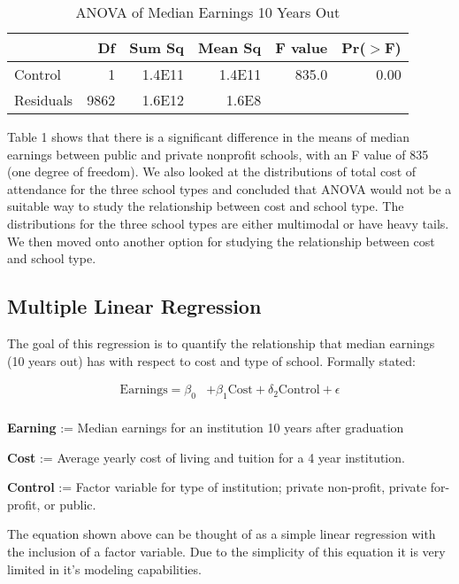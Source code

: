 \documentclass[%
 reprint,
 amsmath,amssymb,
 aps,
]{revtex4-1}
\begin{document}
\begin{table}[ht]
	\caption{ANOVA of Median Earnings 10 Years Out}
	\label{Table 1}
	\centering
	\begin{tabular}{lrrrrr}
		  \hline
		   & Df & Sum Sq & Mean Sq & F value & Pr($>$F) \\ 
		     \hline
		     Control & 1 & 1.4E11 & 1.4E11 & 835.0 & 0.00 \\ 
		       Residuals & 9862 & 1.6E12 & 1.6E8 &  &  \\ 
		          \hline
	\end{tabular}
\end{table}


Table 1 shows that there is a significant difference in the means of median earnings between public and private nonprofit schools, with an F value of 835 (one degree of freedom).  We also looked at the distributions of total cost of attendance for the three school types and concluded that ANOVA would not be a suitable way to study the relationship between cost and school type.  The distributions for the three school types are either multimodal or have heavy tails.  We then moved onto another option for studying the relationship between cost and school type.


\subsection{\label{sec:level2} Multiple Linear Regression}
The goal of this regression is to quantify the relationship that median earnings (10 years out) has with respect to cost and type of school. Formally stated: 

\begin{align*}
	\mathrm{Earnings} = \beta_{0} 
    &+ \beta_{1}  \mathrm{Cost} + \delta_{2}  \mathrm{Control} + \epsilon\\
\end{align*}

\textbf{Earning} := Median earnings for an institution 10 years after graduation

\textbf{Cost} := Average yearly cost of living and tuition for a 4 year institution.

\textbf{Control} := Factor variable for type of institution; private non-profit, private for-profit, or public.

\vspace{2mm}

The equation shown above can be thought of as a simple linear regression with the inclusion of a factor variable.  Due to the simplicity of this equation it is very limited in it's modeling capabilities. 
\end{document}

